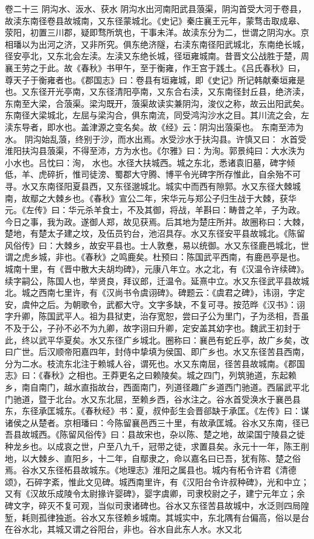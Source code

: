 \documentclass[12pt,UTF8]{ctexbook}
\begin{document}
卷二十三  阴沟水、汳水、获水 
阴沟水出河南阳武县蒗渠，阴沟首受大河于卷县，故渎东南径卷县故城南，又东径蒙城北。《史记》秦庄襄王元年，蒙骛击取成皋、荥阳，初置三川郡，疑即骛所筑也，干事未洋。故渎东分为二，世谓之阴沟水。京相璠以为出河之济，又非所究。俱东绝济隧，右渎东南径阳武城北，东南绝长城，径安亭北，又东北会左渎。左渎又东绝长城，径垣雍城南。昔晋文公战胜于楚，周襄王劳之于此。故《春秋》书甲午，至于衡雍，作王宫于践土。《吕氏春秋》曰，尊天子于衡雍者也。《郡国志》曰：卷县有垣雍城，即《史记》所记韩献秦垣雍是也。又东径开光亭南，又东径清阳亭南，又东合右渎，又东南径封丘县，绝济渎，东南至大梁，合蒗渠。梁沟既开，蒗渠故读实兼阴沟，浚仪之称，故云出阳武矣。东南径大梁城北，左屈与梁沟合，俱东南流，同受鸿沟沙水之目。其川流之会，左渎东导者，即水也。盖津源之变名矣。故《经》云：阴沟出蒗渠也。
东南至沛为水。
阴沟始乱蒗，终别于沙，而水出焉。水受沙水于扶沟县。许慎又曰： 水首受淮阳扶沟县蒗渠，不得至沛，方为水也。《尔雅》曰：为洵。郭景纯曰：大水泆为小水也。吕忱曰：洵， 水也。水径大扶城西。城之东北，悉诸袁旧墓，碑字倾低，羊、虎碎折，惟司徒滂、蜀郡大守腾、博平令光碑字所存惟此，自余殆不可寻。水又东南径阳夏县西，又东径邈城北。城实中而西有隙郭。水又东径大棘城南，故鄢之大棘乡也。《春秋》宣公二年，宋华元与郑公子归生战于大棘，获华元。《左传》曰：华元杀羊食士，不及其御，将战，羊斟曰：畴昔之羊，子为政。今日之事，我为政。遂御人郑，故见获焉。后其地为楚庄所并。故圈称曰：大棘，楚地，有楚太子建之坟，及伍员钓台，池沼具存。水又东径安平县故城北。《陈留风俗传》曰：大棘乡，故安平县也。士人敦惷，易以统御。水又东径鹿邑城北，世谓之虎乡城，非也。《春秋》之鸣鹿矣。杜预曰：陈国武平西南，有鹿邑亭是也。城南十里，有《晋中散大夫胡均碑》，元康八年立。水之北，有《汉温令许续碑》。续字嗣公，陈国人也，举贤良，拜议郎，迁温令。延熹中立。水又东径武平县故城北。城之西南七里许，有《汉尚书令虞诩碑》。碑题云：《虞君之碑》，讳诩，字定安，虞仲之后。为朝歌令，武都大守。文字多缺，不复可寻。按范晔《汉书》：诩字升卿，陈国武平人。祖为县狱吏，治存宽恕，尝曰子公为里门，子为丞相，吾虽不及于公，子孙不必不为九卿，故字诩曰升卿，定安盖其幼字也。魏武王初封于此，终以武平华夏矣。水又东径广乡城北。圈称曰：襄邑有蛇丘亭，故广乡矣，改曰广世。后汉顺帝阳嘉四年，封侍中挚填为侯国、即广乡也。水又东径苦县西南，分为二水。枝流东北注于赖城人谷，谓死也。水又东南屈，径苦县故城南。《郡国志》曰：《春秋》之相也。王莽更名之曰赖陵矣。城之四门，列筑驰道，东起赖乡，南自南门，越水直指故台，西面南门，列道径趣广乡道西门驰道。西届武平北门驰道，暨于北台。水又东北屈，至赖乡西，谷水注之。谷水首受涣水于襄邑县东，东径承匡城东。《春秋经》书：夏，叔仲彭生会晋郤缺于承匡。《左传》曰：谋诸侯之从楚者。京相璠曰：今陈留襄邑西三十里，有故承匡城。谷水又东南，径已吾县故城西。《陈留风俗传》曰：县故宋也，杂以陈、楚之地，故梁国宁陵县之徙种龙乡也。以成哀之世，户至八九千，冠带之徒，求置县矣。永元十一年，陈王削地，以大棘乡、直阳乡，十二年，自鄢隶之，命以嘉名曰已吾，犹有陈、楚之俗焉。谷水又东径柘县故城东。《地理志》淮阳之属县也。城内有柘令许君《清德颂》，石碎字紊，惟此文见碑。城西南里许，有《汉阳台令许叔种碑》，光和中立；又有《汉故乐成陵令太尉掾许婴碑》，婴字虞卿，司隶校尉之子，建宁元年立；余碑文字，碎灭不复可观，当似司隶诸碑也。谷水又东径苦县故城中，水泛则四局隍堑，耗则孤律独逝。谷水又东径赖乡城南。其城实中，东北隅有台偏高，俗以是台在谷水北，其城又谓之谷阳台，非也。谷水自此东人水。水又北
\end{document}
